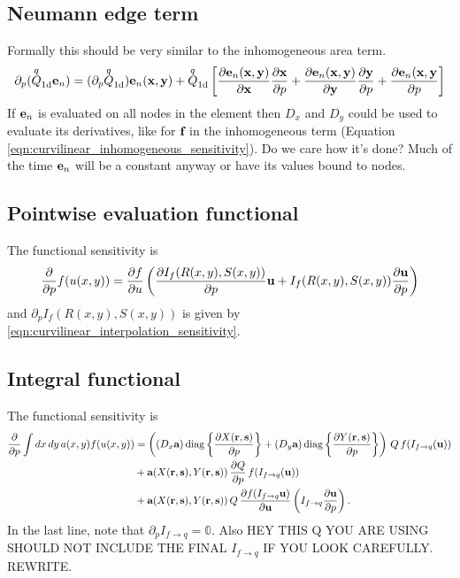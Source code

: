\subsection{Neumann edge term}

Formally this should be very similar to the inhomogeneous area term.
%
\begin{equation}
\partial_p (\overset{q}{Q}_\textrm{1d} \textbf{e}_n) = (\partial_p \overset{q}{Q}_\textrm{1d}) \textbf{e}_n(\textbf{x}, \textbf{y}) +
\overset{q}{Q}_\textrm{1d} \left[ \frac{\partial{\textbf{e}_n(\textbf{x}, \textbf{y})}}{\partial{\textbf{x}}} \frac{\partial{\textbf{x}}}{\partial{p}} + \frac{\partial{\textbf{e}_n(\textbf{x}, \textbf{y})}}{\partial{\textbf{y}}} \frac{\partial{\textbf{y}}}{\partial{p}} + \frac{\partial{\textbf{e}_n(\textbf{x}, \textbf{y}}}{\partial{p}} \right]
\end{equation}
%
If $\textbf{e}_n$ is evaluated on all nodes in the element then $D_x$ and $D_y$ could be used to evaluate its derivatives, like for $\textbf{f}$ in the inhomogeneous term (Equation \ref{eqn:curvilinear_inhomogeneous_sensitivity}).  Do we care how it's done?  Much of the time $\textbf{e}_n$ will be a constant anyway or have its values bound to nodes.

\subsection{Pointwise evaluation functional}

The functional sensitivity is
%
\begin{equation}
\frac{\partial{}}{\partial{p}} f(u(x,y)) = \frac{\partial{f}}{\partial{u}} \left( \frac{\partial{I_f(R(x,y),S(x,y))}}{\partial{p}} \textbf{u} + I_f(R(x,y),S(x,y)) \frac{\partial{\textbf{u}}}{\partial{p}} \right)
\end{equation}
% 
and $\partial_p I_f(R(x,y), S(x,y))$ is given by \ref{eqn:curvilinear_interpolation_sensitivity}.

\subsection{Integral functional}

The functional sensitivity is
%
\begin{equation}
\begin{aligned}
\frac{\partial{}}{\partial{p}} \int dx \, dy \, a(x,y) f(u(x,y)) &=
\left( (D_x \textbf{a}) \operatorname{diag} \left\{ \frac{\partial{X(\textbf{r}, \textbf{s})}}{\partial{p}} \right\} + (D_y \textbf{a}) \operatorname{diag} \left\{ \frac{\partial{Y(\textbf{r}, \textbf{s})}}{\partial{p}} \right\} \right) \, Q \, f(I_{f \rightarrow q}(\textbf{u})) \\
&+ \textbf{a}(X(\textbf{r}, \textbf{s}), Y(\textbf{r}, \textbf{s}))\,  \frac{\partial{Q}}{\partial{p}} \, f(I_{f \rightarrow q}(\textbf{u})) \\
&+ \textbf{a}(X(\textbf{r}, \textbf{s}), Y(\textbf{r}, \textbf{s})) \, Q \, \frac{\partial{f(I_{f \rightarrow q} \textbf{u})}}{\partial{\textbf{u}}} \left( I_{f \rightarrow q} \frac{\partial{\textbf{u}}}{\partial{p}} \right).
\end{aligned}
\end{equation}
%
In the last line, note that $\partial_p I_{f \rightarrow q} = \mathbb{0}$.  Also HEY THIS Q YOU ARE USING SHOULD NOT INCLUDE THE FINAL $I_{f \rightarrow q}$ IF YOU LOOK CAREFULLY.  REWRITE.















